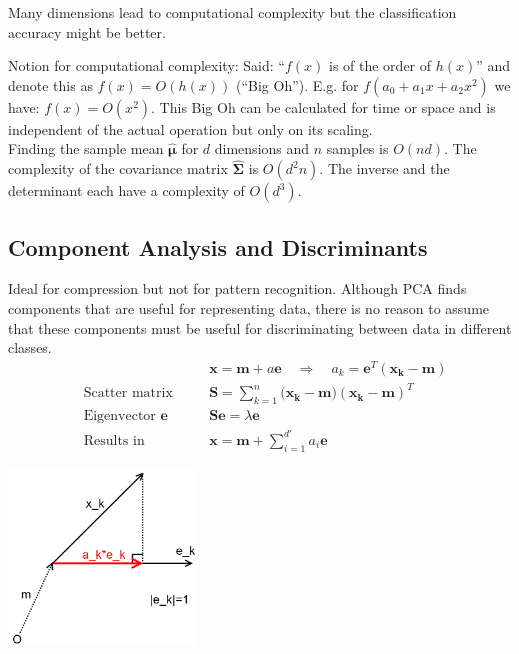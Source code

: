   
  Many dimensions lead to computational complexity but the classification accuracy might be better.
  
  
  Notion for computational complexity: Said: ``$f(x)$ is of the order of $h(x)$'' and denote this as
  $f(x) = O(h(x))$ (``Big Oh''). E.g. for $f(a_0+a_1x+a_2x^2)$ we have: $f(x) = O(x^2)$.
  This Big Oh can be calculated for time or space and is independent of the actual operation but
  only on its scaling. \\
  
  Finding the sample mean $\hat{\boldsymbol{\mu}}$ for $d$ dimensions and $n$ samples is $O(nd)$.
  The complexity of the covariance matrix $\hat{\boldsymbol{\Sigma}}$ is $O(d^2n)$. 
  The inverse and the determinant each have a complexity of $O(d^3)$.
  
  \subsection{Component Analysis and Discriminants}
  
  \begin{minipage}{13cm}
  
  Ideal for compression but not for pattern recognition.
  Although PCA finds components that are useful for representing data, there is no reason to 
  assume that these components must be useful for discriminating between data in different classes.\\
  \begin{align*}
	&  && \bm{x}=\bm{m}+a \bm{e} \quad \Rightarrow \quad a_k=\bm{e}^T(\bm{x_k-m}) \\
    &\text{Scatter matrix} \quad && \bm{S} = \sum\limits_{k=1}^{n}{\bm{(x_k}-\bm{m})(\bm{x_k}-\bm{m})^T} \\
    &\text{Eigenvector } \bm{e} \quad && \bm{S e}=\lambda \bm{e} \\
    &\text{Results in} && \bm{x}=\bm{m}+\sum\limits_{i=1}^{d'}{a_i \bm{e}}
  \end{align*}

  \end{minipage}
  \begin{minipage}{5cm}
  	\includegraphics[width=5cm]{./images/principalComp.png}
  \end{minipage} 
  
